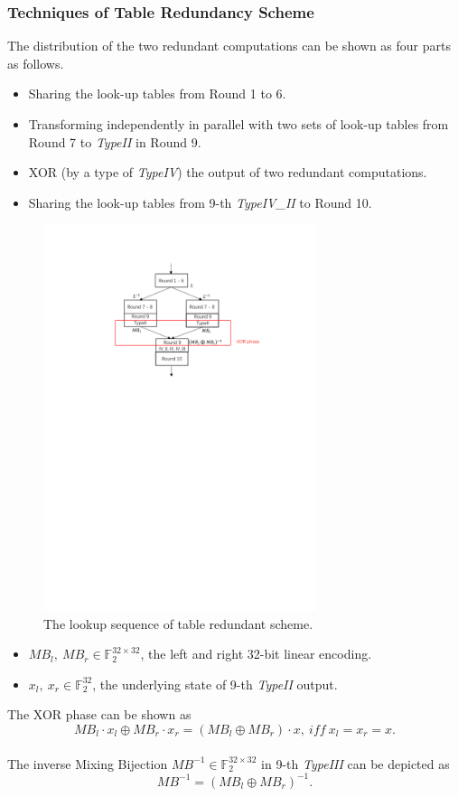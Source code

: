 \documentclass{beamer}
\begin{document}
\frame
{
	\frametitle{Techniques of Table Redundancy Scheme}
	The distribution of the two redundant computations can be shown as four parts as follows.
	\begin{itemize}
		\item Sharing the look-up tables from Round 1 to 6.
		\item Transforming independently in parallel with two sets of look-up tables from Round 7 to \textit{TypeII} in Round 9.
		\item XOR (by a type of \textit{TypeIV}) the output of two redundant computations.
		\item Sharing the look-up tables from 9-th \textit{TypeIV\_II} to Round 10.
	\end{itemize}
}

\frame
{
	\begin{figure}
		\centering
		\includegraphics[width=8cm]{./pics/TRS1.pdf}
		\caption{The lookup sequence of table redundant scheme.}
	\end{figure}
}

\frame
{
	\begin{itemize}
		\item $MB_{l},\ MB_{r} \in \mathbb{F}_{2}^{32\times 32}$, the left and right 32-bit linear encoding.
		\item $x_{l},\ x_{r} \in \mathbb{F}_{2}^{32}$, the underlying state of 9-th \textit{TypeII} output.
	\end{itemize}
	The XOR phase can be shown as 
	\[MB_{l}\cdot x_{l} \oplus MB_{r}\cdot x_{r} = (MB_{l} \oplus MB_{r}) \cdot x,\ iff\ x_{l} = x_{r} = x.\]
	\\[2ex]
	The inverse Mixing Bijection $MB^{-1} \in \mathbb{F}_{2}^{32\times 32}$ in 9-th \textit{TypeIII} can be depicted as \[MB^{-1} = (MB_{l} \oplus MB_{r})^{-1}.\]
}
\end{document}
